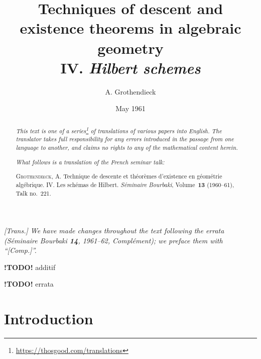 \documentclass{article}
\title{Techniques of descent and existence theorems in algebraic geometry\\IV. \emph{Hilbert schemes}}
\author{A. Grothendieck}
\date{May 1961}
\newcommand{\doctype}{French seminar talk}
\newcommand{\origcit}{%
  \textsc{Grothendieck, A.}
  Technique de descente et th\'{e}or\`{e}mes d'existence en g\'{e}om\'{e}trie alg\'{e}brique. IV. Les sch\'{e}mas de Hilbert.
  \emph{S\'{e}minaire Bourbaki}, Volume~\textbf{13} (1960--61), Talk no.~221.%
}
\newcommand{\todo}{\textbf{ !TODO! }}
\newcommand{\oldpage}[1]{\marginpar{\footnotesize$\Big\vert$ \textit{p.~#1}}}
\begin{document}
\maketitle
\thispagestyle{fancy}

\renewcommand{\abstractname}{Translator's note.}

\begin{abstract}
  \renewcommand*{\thefootnote}{\fnsymbol{footnote}}
  \emph{This text is one of a series\footnote{\url{https://thosgood.com/translations}} of translations of various papers into English.}
  \emph{The translator takes full responsibility for any errors introduced in the passage from one language to another, and claims no rights to any of the mathematical content herein.}

  \medskip
  
  \emph{What follows is a translation of the \doctype:}

  \medskip\noindent
  \origcit
\end{abstract}

\setcounter{footnote}{0}

\setcounter{tocdepth}{1}
\tableofcontents



\subsubsection*{}

\emph{[Trans.] We have made changes throughout the text following the errata (\emph{S\'{e}minaire Bourbaki} \textbf{14}, 1961--62, Compl\'{e}ment); we preface them with ``[Comp.]''.}
\medskip

\todo additif

\todo errata


\section*{Introduction}
\oldpage{221-01}






\end{document}
